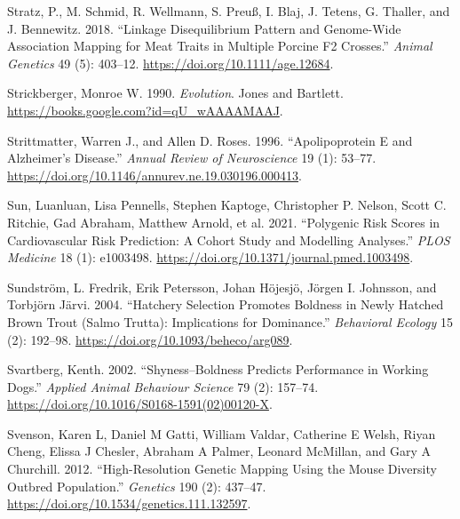 \documentclass[
]{book}
\newlength{\cslhangindent}
\newlength{\cslentryspacingunit} %
\newenvironment{CSLReferences}[2] %
 {%
  \setlength{\parindent}{0pt}
  \ifodd #1
  \let\oldpar\par
  \def\par{\hangindent=\cslhangindent\oldpar}
  \fi
  \setlength{\parskip}{#2\cslentryspacingunit}
 }%
 {}
\begin{document}
\begin{CSLReferences}{1}{0}
\leavevmode{}%
Stratz, P., M. Schmid, R. Wellmann, S. Preuß, I. Blaj, J. Tetens, G. Thaller, and J. Bennewitz. 2018. {``Linkage Disequilibrium Pattern and Genome-Wide Association Mapping for Meat Traits in Multiple Porcine {F2} Crosses.''} \emph{Animal Genetics} 49 (5): 403--12. \url{https://doi.org/10.1111/age.12684}.

\leavevmode{}%
Strickberger, Monroe W. 1990. \emph{Evolution}. {Jones and Bartlett}. \url{https://books.google.com?id=qU_wAAAAMAAJ}.

\leavevmode{}%
Strittmatter, Warren J., and Allen D. Roses. 1996. {``Apolipoprotein {E} and {Alzheimer}'s {Disease}.''} \emph{Annual Review of Neuroscience} 19 (1): 53--77. \url{https://doi.org/10.1146/annurev.ne.19.030196.000413}.

\leavevmode{}%
Sun, Luanluan, Lisa Pennells, Stephen Kaptoge, Christopher P. Nelson, Scott C. Ritchie, Gad Abraham, Matthew Arnold, et al. 2021. {``Polygenic Risk Scores in Cardiovascular Risk Prediction: {A} Cohort Study and Modelling Analyses.''} \emph{PLOS Medicine} 18 (1): e1003498. \url{https://doi.org/10.1371/journal.pmed.1003498}.

\leavevmode{}%
Sundström, L. Fredrik, Erik Petersson, Johan Höjesjö, Jörgen I. Johnsson, and Torbjörn Järvi. 2004. {``Hatchery Selection Promotes Boldness in Newly Hatched Brown Trout ({Salmo} Trutta): Implications for Dominance.''} \emph{Behavioral Ecology} 15 (2): 192--98. \url{https://doi.org/10.1093/beheco/arg089}.

\leavevmode{}%
Svartberg, Kenth. 2002. {``Shyness--Boldness Predicts Performance in Working Dogs.''} \emph{Applied Animal Behaviour Science} 79 (2): 157--74. \url{https://doi.org/10.1016/S0168-1591(02)00120-X}.

\leavevmode{}%
Svenson, Karen L, Daniel M Gatti, William Valdar, Catherine E Welsh, Riyan Cheng, Elissa J Chesler, Abraham A Palmer, Leonard McMillan, and Gary A Churchill. 2012. {``High-{Resolution Genetic Mapping Using} the {Mouse Diversity Outbred Population}.''} \emph{Genetics} 190 (2): 437--47. \url{https://doi.org/10.1534/genetics.111.132597}.


\end{CSLReferences}
\end{document}
